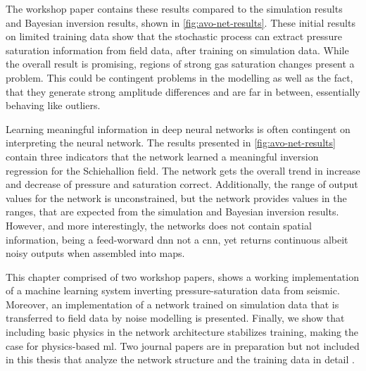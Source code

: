 The workshop paper \citet{dramsch2019deep} contains these results compared to the simulation results and Bayesian inversion results, shown in \cref{fig:avo-net-results}. These initial results on limited training data show that the stochastic process can extract pressure saturation information from field data, after training on simulation data. While the overall result is promising, regions of strong gas saturation changes present a problem. This could be contingent problems in the modelling as well as the fact, that they generate strong amplitude differences and are far in between, essentially behaving like outliers. 

Learning meaningful information in deep neural networks is often contingent on interpreting the neural network. The results presented in \cref{fig:avo-net-results} contain three indicators that the network learned a meaningful inversion regression for the Schiehallion field. The network gets the overall trend in increase and decrease of pressure and saturation correct. Additionally, the range of output values for the network is unconstrained, but the network provides values in the ranges, that are expected from the simulation and Bayesian inversion results.  However, and more interestingly, the networks does not contain spatial information, being a feed-worward \ac{dnn} not a \ac{cnn}, yet returns continuous albeit noisy outputs when assembled into maps.

This chapter comprised of two workshop papers, shows a working implementation of a machine learning system inverting pressure-saturation data from seismic. Moreover, an implementation of a network trained on simulation data that is transferred to field data by noise modelling is presented. Finally, we show that including basic physics in the network architecture stabilizes training, making the case for physics-based \acl{ml}. Two journal papers are in preparation but not included in this thesis that analyze the network structure and the training data in detail \citep{corte2019exploring,dramsch2020physics}. 



